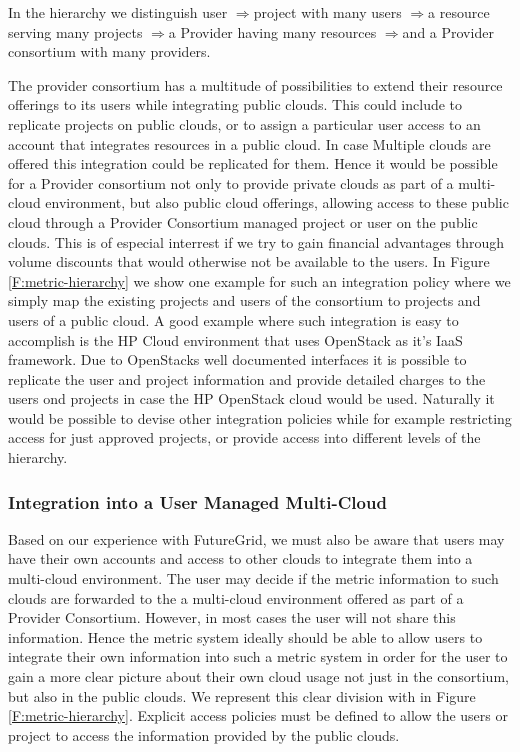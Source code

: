 \documentclass{tex/sig-alternate}
\begin{document}
{\newcommand{\ARROW}{$\Rightarrow$}

In the hierarchy we distinguish user \ARROW project with many users
\ARROW a resource serving many projects \ARROW a Provider having many
resources \ARROW and a Provider consortium with many providers. 

The provider consortium has a multitude of possibilities to extend
their resource offerings to its users while integrating public
clouds. This could include to replicate projects on public clouds, or
to assign a particular user access to an account that integrates
resources in a public cloud. In case Multiple clouds are offered this
integration could be replicated for them. Hence it would be possible
for a Provider consortium not only to provide private clouds as part
of a multi-cloud environment, but also public cloud offerings, allowing
access to these public cloud through a Provider Consortium managed
project or user on the public clouds. This is of especial interrest if
we try to gain financial advantages through volume discounts that
would otherwise not be available to the users. 
In Figure \ref{F:metric-hierarchy} we show one example for such an
integration policy where we simply map the existing projects and users
of the consortium to projects and users of a public cloud. A good
example where such integration is easy to accomplish is the HP Cloud
environment that uses OpenStack as it's IaaS framework. Due to
OpenStacks well documented interfaces it is possible to replicate the
user and project information and provide detailed charges to the users
ond projects in case the HP OpenStack cloud would be used. Naturally
it would be possible to devise other integration policies while for
example restricting access for just approved projects, or provide
access into different levels of the hierarchy.

\subsubsection{Integration into a User Managed Multi-Cloud}

Based on our experience with FutureGrid, we must also be aware that
users may have their own accounts and access to other clouds to
integrate them into a multi-cloud environment. The user may decide if
the metric information to such clouds are forwarded to the a
multi-cloud environment offered as part of a Provider
Consortium. However, in most cases the user will not share this
information. Hence the metric system ideally should be able to allow
users to integrate their own information into such a metric system in
order for the user to gain a more clear picture about their own
cloud usage not just in the consortium, but also in the public
clouds. We represent this clear division with in Figure
\ref{F:metric-hierarchy}. Explicit access policies must be defined to
allow the users or project to access the information provided by the
public clouds.


}
\end{document}
